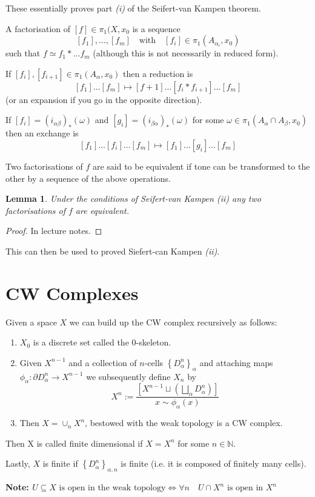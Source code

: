\documentclass[11pt]{article}
\newcommand{\defeq}{:=}
\newcommand{\N}{\mathbb{N}}
\newenvironment{defin}
	{\begin{mdframed}[backgroundcolor=white, roundcorner=5pt, linewidth=1pt]}
	{\end{mdframed}}
\newcommand{\mdf}[1]{{\color{red} #1}}
\newenvironment{note}
	{\begin{mdframed}[backgroundcolor=white, linecolor=red, roundcorner=5pt, linewidth=1pt]\bfseries{Note:}\normalfont}
	{\end{mdframed}}
\newtheorem{lemma}[theorem]{Lemma}
\begin{document}
These essentially proves part \textit{(i)} of the Seifert-van Kampen theorem.

\begin{defin}
	A \mdf{factorisation} of $[f]\in\pi_1(X, x_0$ is a sequence
	\[
		[f_1], \dots, [f_m] \quad \text{with}\quad [f_i]\in\pi_1(A_{\alpha_i}, x_0)
	\]
	such that $f\simeq f_1\ast \dots f_m$ (although this is not necessarily in reduced form).

	If $[f_i], [f_{i+1}]\in\pi_1(A_\alpha, x_0)$ then a \mdf{reduction} is
	\[
		[f_1] \dots [f_m] \mapsto [f+1] \dots [f_i \ast f_{i+1}] \dots [f_m] 
	\]
	(or an \mdf{expansion} if you go in the opposite direction).

	If $[f_i]=(i_{\alpha\beta})_\ast(\omega)$ and $[g_i]=(i_{\beta\alpha})_\ast(\omega)$ for some $\omega\in\pi_1(A_\alpha\cap A_\beta, x_0)$ then an \mdf{exchange} is
	\[
		[f_1]\dots[f_i]\dots[f_m]\mapsto [f_1]\dots[g_i]\dots[f_m]
	\]

	Two factorisations of $f$ are said to be \mdf{equivalent} if tone can be transformed to the other by a sequence of the above operations.
\end{defin}

\begin{lemma}
Under the conditions of Seifert-van Kampen \textit{(ii)} any two factorisations of $f$ are equivalent.
\end{lemma}

\begin{proof}
In lecture notes.
\end{proof}

This can then be used to proved Siefert-can Kampen \textit{(ii)}.

\section{CW Complexes}
\begin{defin}
	Given a space $X$ we can build up the \mdf{CW complex} recursively as follows:
	\begin{enumerate}
		\item $X_0$ is a discrete set called the \mdf{$0$-skeleton}.
		\item Given $X^{n-1}$ and a collection of \mdf{$n$-cells} $\left\{D_\alpha^n\right\}_\alpha$ and attaching maps $\phi_\alpha:\partial D_\alpha^n\to X^{n-1}$ we subsequently define $X_n$ by
			\[
				X^n\defeq\frac{\left[X^{n-1}\sqcup\left(\bigsqcup_\alpha D_\alpha^n \right)\right]}{x\sim \phi_\alpha(x)}
			\]
		\item Then $X=\cup_n X^n$, bestowed with the \mdf{weak topology} is a \mdf{CW complex}.
	\end{enumerate}


	Then X is called \mdf{finite dimensional} if $X=X^n$ for some $n\in\N$.

	Lastly, $X$ is \mdf{finite} if $\left\{D_\alpha^n \right\}_{\alpha, n}$ is finite (i.e. it is composed of finitely many cells).
\end{defin}
\begin{note}
		$U\subseteq X \text{ is open in the weak topology} \iff \forall n \quad U\cap X^n \text{ is open in } X^n$
\end{note}
\end{document}

